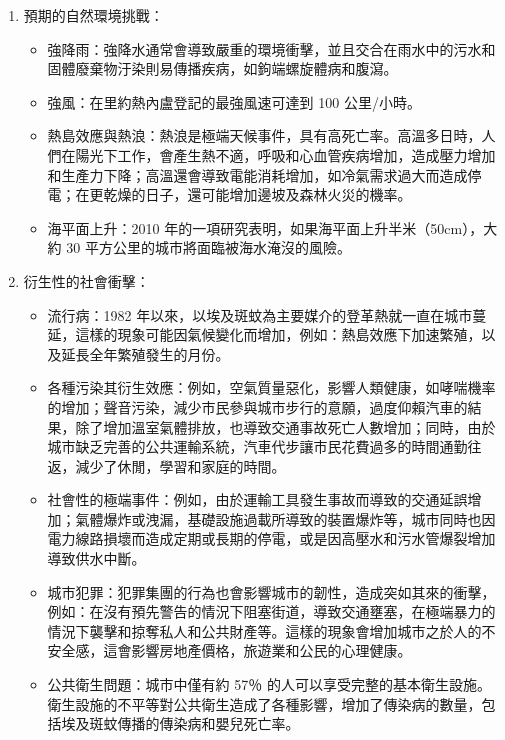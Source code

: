 \documentclass[a4paper,12pt]{article}
\begin{document}
\begin{enumerate}
\begin{enumerate}
\begin{enumerate}
\item 預期的自然環境挑戰：
\label{sec:org5163cf3}

\begin{itemize}
\item 強降雨：強降水通常會導致嚴重的環境衝擊，並且交合在雨水中的污水和固體廢棄物汙染則易傳播疾病，如鉤端螺旋體病和腹瀉。\\
\item 強風：在里約熱內盧登記的最強風速可達到 100 公里/小時。\\
\item 熱島效應與熱浪：熱浪是極端天候事件，具有高死亡率。高溫多日時，人們在陽光下工作，會產生熱不適，呼吸和心血管疾病增加，造成壓力增加和生產力下降；高溫還會導致電能消耗增加，如冷氣需求過大而造成停電；在更乾燥的日子，還可能增加邊坡及森林火災的機率。\\
\item 海平面上升：2010 年的一項研究表明，如果海平面上升半米（50cm），大約 30 平方公里的城市將面臨被海水淹沒的風險。\\
\end{itemize}
\item 衍生性的社會衝擊：
\label{sec:orga393d6f}

\begin{itemize}
\item 流行病：1982 年以來，以埃及斑蚊為主要媒介的登革熱就一直在城市蔓延，這樣的現象可能因氣候變化而增加，例如：熱島效應下加速繁殖，以及延長全年繁殖發生的月份。\\
\item 各種污染其衍生效應：例如，空氣質量惡化，影響人類健康，如哮喘機率的增加；聲音污染，減少市民參與城市步行的意願，過度仰賴汽車的結果，除了增加溫室氣體排放，也導致交通事故死亡人數增加；同時，由於城市缺乏完善的公共運輸系統，汽車代步讓市民花費過多的時間通勤往返，減少了休閒，學習和家庭的時間。\\
\item 社會性的極端事件：例如，由於運輸工具發生事故而導致的交通延誤增加；氣體爆炸或洩漏，基礎設施過載所導致的裝置爆炸等，城市同時也因電力線路損壞而造成定期或長期的停電，或是因高壓水和污水管爆裂增加導致供水中斷。\\
\item 城市犯罪：犯罪集團的行為也會影響城市的韌性，造成突如其來的衝擊，例如：在沒有預先警告的情況下阻塞街道，導致交通壅塞，在極端暴力的情況下襲擊和掠奪私人和公共財產等。這樣的現象會增加城市之於人的不安全感，這會影響房地產價格，旅遊業和公民的心理健康。\\
\item 公共衛生問題：城市中僅有約 57％ 的人可以享受完整的基本衛生設施。衛生設施的不平等對公共衛生造成了各種影響，增加了傳染病的數量，包括埃及斑蚊傳播的傳染病和嬰兒死亡率。\\
\end{itemize}
\end{enumerate}


\end{enumerate}
\end{enumerate}
\end{document}
